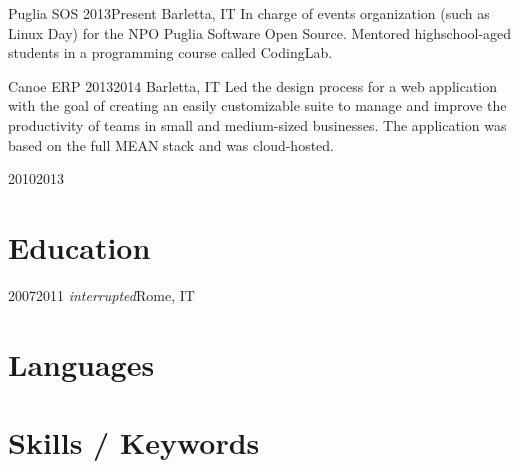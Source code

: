 \documentclass{resume}
\begin{document}
%
    {Puglia SOS}%
    {2013}{Present}%
    {Barletta, IT}%
    {In charge of events organization (such as Linux Day) for the NPO Puglia
        Software Open Source. Mentored highschool-aged students in a
        programming course called CodingLab.}

%
    {Canoe ERP}%
    {2013}{2014}%
    {Barletta, IT}%
    {Led the design process for a web application with the goal of creating an
        easily customizable suite to manage and improve the productivity of
        teams in small and medium-sized businesses.  The application was based
        on the full MEAN stack and was cloud-hosted.}

%
    {}%
    {2010}{2013}%
    {}{}

\section{Education}

%
    {2007}{2011 \lbrack \textit{interrupted}\rbrack}{Rome, IT}{}

\section{Languages}

\begin{languagessection}
\end{languagessection}

\section{Skills / Keywords}

\end{document}
